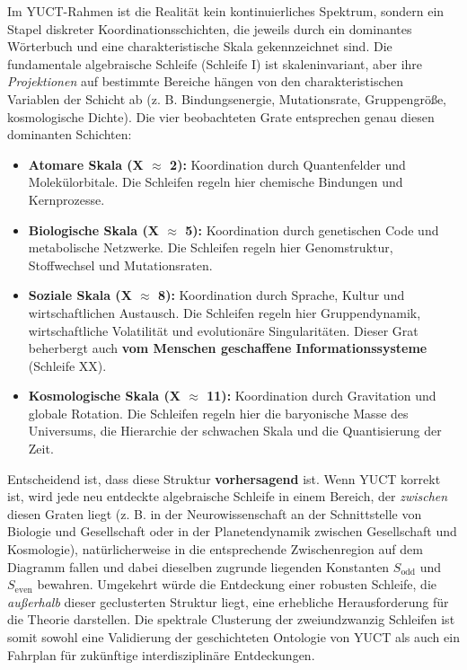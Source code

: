 \documentclass[12pt,a4paper]{article}
\begin{document}
	Im YUCT-Rahmen ist die Realität kein kontinuierliches Spektrum, sondern ein Stapel diskreter Koordinationsschichten, die jeweils durch ein dominantes Wörterbuch und eine charakteristische Skala gekennzeichnet sind. Die fundamentale algebraische Schleife (Schleife I) ist skaleninvariant, aber ihre \textit{Projektionen} auf bestimmte Bereiche hängen von den charakteristischen Variablen der Schicht ab (z. B. Bindungsenergie, Mutationsrate, Gruppengröße, kosmologische Dichte). Die vier beobachteten Grate entsprechen genau diesen dominanten Schichten:
	\begin{itemize}
		\item \textbf{Atomare Skala (X $\approx$ 2):} Koordination durch Quantenfelder und Molekülorbitale. Die Schleifen regeln hier chemische Bindungen und Kernprozesse.
		\item \textbf{Biologische Skala (X $\approx$ 5):} Koordination durch genetischen Code und metabolische Netzwerke. Die Schleifen regeln hier Genomstruktur, Stoffwechsel und Mutationsraten.
		\item \textbf{Soziale Skala (X $\approx$ 8):} Koordination durch Sprache, Kultur und wirtschaftlichen Austausch. Die Schleifen regeln hier Gruppendynamik, wirtschaftliche Volatilität und evolutionäre Singularitäten. Dieser Grat beherbergt auch \textbf{vom Menschen geschaffene Informationssysteme} (Schleife XX).
		\item \textbf{Kosmologische Skala (X $\approx$ 11):} Koordination durch Gravitation und globale Rotation. Die Schleifen regeln hier die baryonische Masse des Universums, die Hierarchie der schwachen Skala und die Quantisierung der Zeit.
	\end{itemize}
	
	Entscheidend ist, dass diese Struktur \textbf{vorhersagend} ist. Wenn YUCT korrekt ist, wird jede neu entdeckte algebraische Schleife in einem Bereich, der \textit{zwischen} diesen Graten liegt (z. B. in der Neurowissenschaft an der Schnittstelle von Biologie und Gesellschaft oder in der Planetendynamik zwischen Gesellschaft und Kosmologie), natürlicherweise in die entsprechende Zwischenregion auf dem Diagramm fallen und dabei dieselben zugrunde liegenden Konstanten \(S_{\mathrm{odd}}\) und \(S_{\mathrm{even}}\) bewahren. Umgekehrt würde die Entdeckung einer robusten Schleife, die \textit{außerhalb} dieser geclusterten Struktur liegt, eine erhebliche Herausforderung für die Theorie darstellen. Die spektrale Clusterung der zweiundzwanzig Schleifen ist somit sowohl eine Validierung der geschichteten Ontologie von YUCT als auch ein Fahrplan für zukünftige interdisziplinäre Entdeckungen.
	
\end{document}
